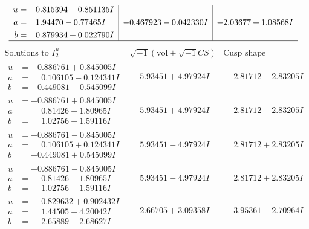 \documentclass[1p]{elsarticle_modified}
\theoremstyle{definition}
\newcommand{\I}{\sqrt{-1}}
\begin{document}
$$\begin{array}{c|c|c}
\begin{aligned}
u &= -0.815394 - 0.851135 I \\
a &= \phantom{-}1.94470 - 0.77465 I \\
b &= \phantom{-}0.879934 + 0.022790 I\end{aligned}
 & -0.467923 - 0.042330 I & -2.03677 + 1.08568 I\\
 \hline 
 \end{array}$$\newpage$$\begin{array}{c|c|c}  
\text{Solutions to }I^u_{2}& \I (\text{vol} + \sqrt{-1}CS) & \text{Cusp shape}\\
 \hline 
\begin{aligned}
u &= -0.886761 + 0.845005 I \\
a &= \phantom{-}0.106105 - 0.124341 I \\
b &= -0.449081 - 0.545099 I\end{aligned}
 & \phantom{-}5.93451 + 4.97924 I & \phantom{-}2.81712 - 2.83205 I \\ \hline\begin{aligned}
u &= -0.886761 + 0.845005 I \\
a &= \phantom{-}0.81426 + 1.80965 I \\
b &= \phantom{-}1.02756 + 1.59116 I\end{aligned}
 & \phantom{-}5.93451 + 4.97924 I & \phantom{-}2.81712 - 2.83205 I \\ \hline\begin{aligned}
u &= -0.886761 - 0.845005 I \\
a &= \phantom{-}0.106105 + 0.124341 I \\
b &= -0.449081 + 0.545099 I\end{aligned}
 & \phantom{-}5.93451 - 4.97924 I & \phantom{-}2.81712 + 2.83205 I \\ \hline\begin{aligned}
u &= -0.886761 - 0.845005 I \\
a &= \phantom{-}0.81426 - 1.80965 I \\
b &= \phantom{-}1.02756 - 1.59116 I\end{aligned}
 & \phantom{-}5.93451 - 4.97924 I & \phantom{-}2.81712 + 2.83205 I \\ \hline\begin{aligned}
u &= \phantom{-}0.829632 + 0.902432 I \\
a &= \phantom{-}1.44505 - 4.20042 I \\
b &= \phantom{-}2.65889 - 2.68627 I\end{aligned}
 & \phantom{-}2.66705 + 3.09358 I & \phantom{-}3.95361 - 2.70964 I \\ \hline\begin{aligned}

\end{aligned}
\end{array}$$
\end{document}
